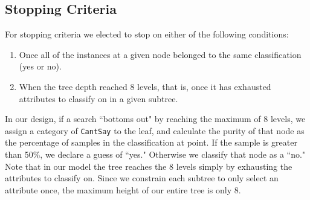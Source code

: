 \documentclass[letterpaper,12pt]{article}
\begin{document}


\subsection{Stopping Criteria}

For stopping criteria we elected to stop on either of the following conditions:

\begin{enumerate}
  \item Once all of the instances at a given node belonged to the same classification (yes or no).
  \item When the tree depth reached 8 levels, that is, once it has exhausted attributes to classify on in a given subtree. 
\end{enumerate}

In our design, if a search ``bottoms out" by reaching the maximum of 8 levels, we assign a category of \texttt{CantSay} to the leaf, and calculate the purity of that node as the percentage of samples in the classification at point. If the sample is greater than 50\%, we declare a guess of ``yes." Otherwise we classify that node as a ``no." Note that in our model the tree reaches the 8 levels simply by exhausting the attributes to classify on. Since we constrain each subtree to only select an attribute once, the maximum height of our entire tree is only 8.
\end{document}
